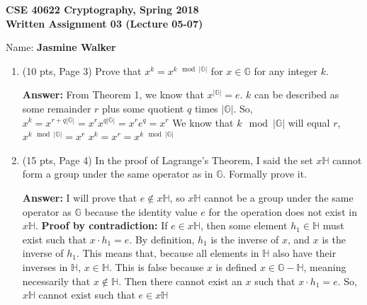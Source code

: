 \documentclass[10pt]{article}
\begin{document}






\begin{center}
	\textbf{CSE 40622 Cryptography, Spring 2018\\Written Assignment 03 (Lecture 05-07)}
\end{center}


Name: \textbf{Jasmine Walker}



\begin{enumerate}
	\item (10 pts, Page 3) Prove that $x^k=x^{k\mod |\mathbb{G}|}$ for $x\in \mathbb{G}$ for any integer $k$.

	\textbf{Answer:} \newline From Theorem 1, we know that $x^{|\mathbb{G}|}=e$. $k$ can be described as some remainder $r$ plus some quotient $q$ times $|\mathbb{G}|$. So, \newline $x^{k}=x^{r+q|\mathbb{G}|}=x^{r}x^{q|\mathbb{G}|}=x^{r}e^{q}=x^{r}$ \newline We know that $k\mod |\mathbb{G}|$ will equal $r$, \newline $x^{k\mod |\mathbb{G}|}=x^{r}$ \newline $x^{k}=x^{r}=x^{k\mod |\mathbb{G}|}$ 
	
	\bigskip\item (15 pts, Page 4) In the proof of Lagrange's Theorem, I said the set $x\mathbb{H}$ cannot form a group under the same operator as in $\mathbb{G}$. Formally prove it.
	
	\textbf{Answer:} \newline I will prove that $e\not\in x\mathbb{H}$, so $x\mathbb{H}$ cannot be a group under the same operator as $\mathbb{G}$ because the identity value $e$ for the operation does not exist in $x\mathbb{H}$. \newline \textbf{Proof by contradiction:} \newline If $e\in x\mathbb{H}$, then some element $h_{1}\in\mathbb{H}$ must exist such that $x\cdot h_1=e$. By definition, $h_1$ is the inverse of $x$, and $x$ is the inverse of $h_1$. This means that, because all elements in $\mathbb{H}$ also have their inverses in $\mathbb{H}$, $x\in\mathbb{H}$. This is false because $x$ is defined $x\in \mathbb{G}- \mathbb{H}$, meaning necessarily that $x\not\in\mathbb{H}$. Then there cannot exist an $x$ such that $x\cdot h_1=e$. So, $x\mathbb{H}$ cannot exist such that $e\in x\mathbb{H}$
	

\end{enumerate}
\end{document}

